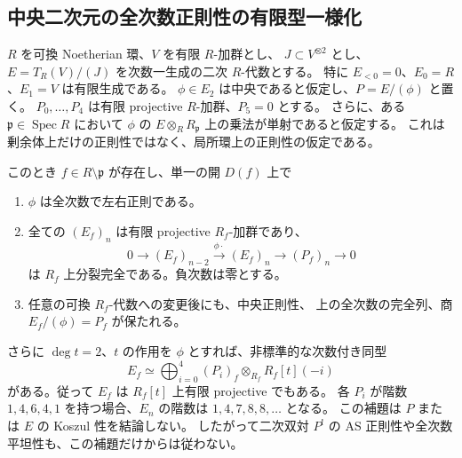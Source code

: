\subsection{中央二次元の全次数正則性の有限型一様化}

\begin{lemma}[有限な二次商から中央正則線を一様化する]
\label{lem:spread-central-regular-line}
$R$ を可換 Noetherian 環、$V$ を有限 $R$-加群とし、
$J\subset V^{\otimes2}$ とし、$E=T_R(V)/(J)$ を次数一生成の二次 $R$-代数とする。
特に $E_{<0}=0$、$E_0=R$、$E_1=V$ は有限生成である。
$\phi\in E_2$ は中央であると仮定し、$P=E/(\phi)$ と置く。
$P_0,\ldots,P_4$ は有限 projective $R$-加群、$P_5=0$ とする。
さらに、ある $\mathfrak p\in\operatorname{Spec}R$ において
$\phi$ の $E\otimes_RR_{\mathfrak p}$ 上の乗法が単射であると仮定する。
これは剰余体上だけの正則性ではなく、局所環上の正則性の仮定である。

このとき $f\in R\setminus\mathfrak p$ が存在し、単一の開 $D(f)$ 上で
\begin{enumerate}
\item $\phi$ は全次数で左右正則である。
\item 全ての $(E_f)_n$ は有限 projective $R_f$-加群であり、
  \[
  0\longrightarrow(E_f)_{n-2}\xrightarrow{\phi\cdot}(E_f)_n
       \longrightarrow(P_f)_n\longrightarrow0
  \tag{SC-exact}\label{eq:spread-central-regular-sequence}
  \]
  は $R_f$ 上分裂完全である。負次数は零とする。
\item 任意の可換 $R_f$-代数への変更後にも、中央正則性、
  上の全次数の完全列、商 $E_f/(\phi)=P_f$ が保たれる。
\end{enumerate}
さらに $\deg t=2$、$t$ の作用を $\phi$ とすれば、非標準的な次数付き同型
\[
 E_f\simeq\bigoplus_{i=0}^4(P_i)_f\otimes_{R_f}R_f[t](-i)
 \tag{SC-module}\label{eq:spread-central-projective-module}
\]
がある。従って $E_f$ は $R_f[t]$ 上有限 projective でもある。
各 $P_i$ が階数 $1,4,6,4,1$ を持つ場合、$E_n$ の階数は
$1,4,7,8,8,\ldots$ となる。
この補題は $P$ または $E$ の Koszul 性を結論しない。
したがって二次双対 $P^!$ の AS 正則性や全次数平坦性も、この補題だけからは従わない。
\end{lemma}


